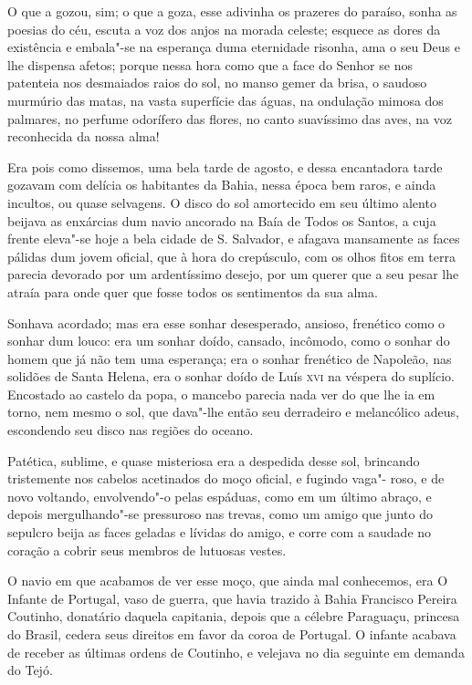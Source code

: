 O que a gozou, sim; o que a goza, esse adivinha os prazeres do paraíso,
sonha as poesias do céu, escuta a voz dos anjos na morada celeste;
esquece as dores da existência e embala"-se na esperança duma eternidade
risonha, ama o seu Deus e lhe dispensa afetos; porque nessa hora como
que a face do Senhor se nos patenteia nos desmaiados raios do sol, no
manso gemer da brisa, o saudoso murmúrio das matas, na vasta superfície
das águas, na ondulação mimosa dos palmares, no perfume odorífero das
flores, no canto suavíssimo das aves, na voz reconhecida da nossa alma!

Era pois como dissemos, uma bela tarde de agosto, e dessa encantadora
tarde gozavam com delícia os habitantes da Bahia, nessa época bem raros,
e ainda incultos, ou quase selvagens. O disco do sol amortecido em seu
último alento beijava as enxárcias dum navio ancorado na Baía de Todos
os Santos, a cuja frente eleva"-se hoje a bela cidade de S. Salvador, e
afagava mansamente as faces pálidas dum jovem oficial, que à hora do
crepúsculo, com os olhos fitos em terra parecia devorado por um
ardentíssimo desejo, por um querer que a seu pesar lhe atraía para onde
quer que fosse todos os sentimentos da sua alma.

Sonhava acordado; mas era esse sonhar desesperado, ansioso, frenético
como o sonhar dum louco: era um sonhar doído, cansado, incômodo, como o
sonhar do homem que já não tem uma esperança; era o sonhar frenético de
Napoleão, nas solidões de Santa Helena, era o sonhar doído de Luís \textsc{xvi}
na véspera do suplício. Encostado ao castelo da popa, o mancebo parecia
nada ver do que lhe ia em torno, nem mesmo o sol, que dava"-lhe então seu
derradeiro e melancólico adeus, escondendo seu disco nas regiões do
oceano.

Patética, sublime, e quase misteriosa era a despedida desse sol,
brincando tristemente nos cabelos acetinados do moço oficial, e fugindo
vaga"- roso, e de novo voltando, envolvendo"-o pelas espáduas, como em um
último abraço, e depois mergulhando"-se pressuroso nas trevas, como um
amigo que junto do sepulcro beija as faces geladas e lívidas do amigo, e
corre com a saudade no coração a cobrir seus membros de lutuosas vestes.

O navio em que acabamos de ver esse moço, que ainda mal conhecemos, era
O Infante de Portugal, vaso de guerra, que havia trazido à Bahia
Francisco Pereira Coutinho, donatário daquela capitania, depois que a
célebre Paraguaçu, princesa do Brasil, cedera seus direitos em favor da
coroa de Portugal. O infante acabava de receber as últimas ordens de
Coutinho, e velejava no dia seguinte em demanda do Tejó.

